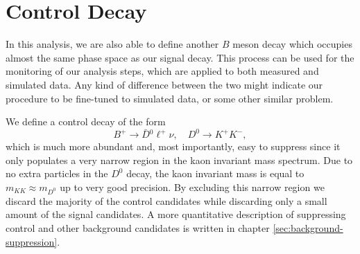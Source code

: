 \section{Control Decay}\label{sec:control-decay}

In this analysis, we are also able to define another $B$ meson decay which occupies almost the same phase space as our signal decay. This process can be used for the monitoring of our analysis steps, which are applied to both measured and simulated data. Any kind of difference between the two might indicate our procedure to be fine-tuned to simulated data, or some other similar problem. 

We define a control decay of the form $$B^+ \to \bar D {}^0 \ell^+ \nu, \quad D^0 \to K^+ K^-,$$ which is much more abundant and, most importantly, easy to suppress since it only populates a very narrow region in the kaon invariant mass spectrum. Due to no extra particles in the $D^0$ decay, the kaon invariant mass is equal to $m_{KK} \approx m_{D^0}$ up to very good precision. By excluding this narrow region we discard the majority of the control candidates while discarding only a small amount of the signal candidates. A more quantitative description of suppressing control and other background candidates is written in chapter \ref{sec:background-suppression}.